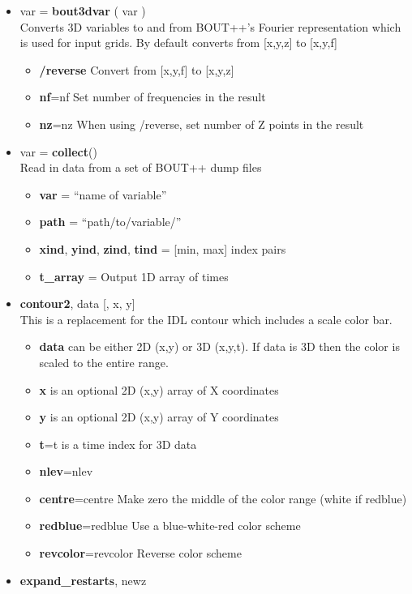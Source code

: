 \documentclass[12pt]{article}
\begin{document}
%
\begin{itemize}
\item var = {\bf bout3dvar} ( var ) \\ Converts 3D variables to and from
    BOUT++'s Fourier representation which is used for input grids. By default
    converts from [x,y,z] to [x,y,f]
  \begin{itemize}
  \item {\bf /reverse}  Convert from [x,y,f] to [x,y,z]
  \item {\bf nf}=nf Set number of frequencies in the result
  \item {\bf nz}=nz When using /reverse, set number of Z points in the result
  \end{itemize}
%
\item var = {\bf collect}() \\
  Read in data from a set of BOUT++ dump files
  \begin{itemize}
    \item {\bf var} = ``name of variable''
    \item {\bf path} = ``path/to/variable/''
    \item {\bf xind}, {\bf yind}, {\bf zind}, {\bf tind}  = [min, max] index
        pairs
    \item {\bf t\_array} = Output 1D array of times
  \end{itemize}
%
\item {\bf contour2}, data [, x, y] \\
  This is a replacement for the IDL contour which includes a scale color bar.
  \begin{itemize}
  \item {\bf data} can be either 2D (x,y) or 3D (x,y,t). If data is 3D then the
      color is scaled to the entire range.
  \item {\bf x} is an optional 2D (x,y) array of X coordinates
  \item {\bf y} is an optional 2D (x,y) array of Y coordinates
  \item {\bf t}=t is a time index for 3D data
  \item {\bf nlev}=nlev
  \item {\bf centre}=centre  Make zero the middle of the color range (white if
      redblue)
  \item {\bf redblue}=redblue  Use a blue-white-red color scheme
  \item {\bf revcolor}=revcolor  Reverse color scheme
  \end{itemize}
%
\item {\bf expand\_restarts}, newz \\

\end{itemize}
\end{document}
